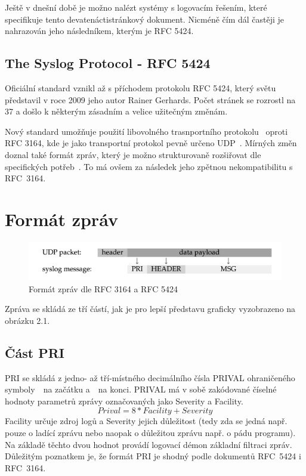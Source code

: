 \documentclass[thesis=B,czech]{FITthesis}[2012/06/26]
\begin{document}
Ještě v dnešní době je možno nalézt systémy s logovacím řešením, které specifikuje tento devatenáctistránkový dokument. Nicméně čím dál častěji je nahrazován jeho následníkem, kterým je RFC 5424.

\subsection{The Syslog Protocol - RFC 5424}
Oficiální standard vznikl až s příchodem protokolu RFC 5424, který světu představil v roce 2009 jeho autor Rainer Gerhards. Počet stránek se rozrostl na 37 a došlo k některým zásadním a velice užitečným změnám.

Nový standard umožňuje použití libovolného trasnportního protokolu~\cite{RFC5424-TrProt} oproti RFC 3164, kde je jako transportní protokol pevně určeno UDP~\cite{RFC3164-UDP}.
Mírných změn doznal také formát zpráv, který je možno strukturovaně rozšiřovat dle specifických potřeb~\cite{RFC5424-MsgForm}. To má ovšem za následek jeho zpětnou nekompatibilitu s RFC~3164.

\section{Formát zpráv}
\begin{figure}[H]
	\centering
	\includegraphics[scale=0.3]{images/syslog-message-format}
	\caption[Formát zpráv dle RFC 3164 a RFC 5424]{Formát zpráv dle RFC 3164 a RFC 5424}
\end{figure}

Zpráva se skládá ze tří částí, jak je pro lepší představu graficky vyzobrazeno na obrázku 2.1.

\subsection{Část PRI}
PRI se skládá z jedno- až tří-místného decimálního čísla PRIVAL ohraničeného symboly~\uv{<}~na začátku a~\uv{>}~na konci.
PRIVAL má v sobě zakódované číselné hodnoty parametrů zprávy označovaných jako Severity a Facility.
$$Prival= 8*Facility+Severity$$
Facility určuje zdroj logů a Severity jejich důležitost (tedy zda se jedná např. pouze o ladící zprávu nebo naopak o důležitou zprávu např. o pádu programu). Na základě těchto dvou hodnot provádí logovací démon základní filtraci zpráv.
Důležitým poznatkem je, že formát PRI je shodný podle dokumentů RFC~5424 i RFC~3164.
\end{document}
